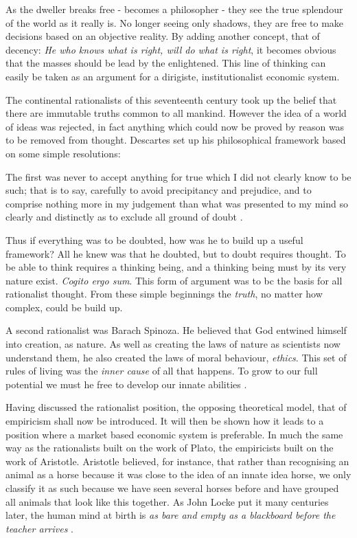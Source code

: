 As the dweller breaks free - becomes a philosopher - they see the true splendour of the world as it really is. No longer seeing only shadows, they are free to make decisions based on an objective reality. By adding another concept, that of decency: \textit{He who knows what is right, will do what is right}, it becomes obvious that the masses should be lead by the enlightened. This line of thinking can easily be taken as an argument for a dirigiste, institutionalist economic system.

The continental rationalists of this seventeenth century took up the belief that there are immutable truths common to all mankind. However the idea of a world of ideas was rejected, in fact anything which could now be proved by reason was to be removed from thought. Descartes set up his philosophical framework based on some simple resolutions:

\begin{displayquote}
The first was never to accept anything for true which I did not clearly know to be such; that is to say, carefully to avoid precipitancy and prejudice, and to comprise nothing more in my judgement than what was presented to my mind so clearly and distinctly as to exclude all ground of doubt \cite{Descartes:1637}.
\end{displayquote}

Thus if everything was to be doubted, how was he to build up a useful framework? All he knew was that he doubted, but to doubt requires thought. To be able to think requires a thinking being, and a thinking being must by its very nature exist. \titlefont\textit{Cogito ergo sum}. This form of argument was to bc the basis for all rationalist thought. From these simple beginnings the \textit{truth}, no matter how complex, could be build up.

A second rationalist was Barach Spinoza. He believed that God entwined himself into creation, as nature. As well as creating the laws of nature as scientists now understand them, he also created the laws of moral behaviour, \textit{ethics}. This set of rules of living was the \textit{inner cause} of all that happens. To grow to our full potential we must he free to develop our innate abilities \cite{Spinoza:1677}.

Having discussed the rationalist position, the opposing theoretical model, that of empiricism shall now be introduced. It will then be shown how it leads to a position where a market based economic system is preferable. In much the same way as the rationalists built on the work of Plato, the empiricists built on the work of Aristotle. Aristotle believed, for instance, that rather than recognising an animal as a horse because it was close to the idea of an innate idea horse, we only classify it as such because we have seen several horses before and have grouped all animals that look like this together. As John Locke put it many centuries later, the human mind at birth is \textit{as bare and empty as a blackboard before the teacher arrives} \cite{Locke:1689}.

